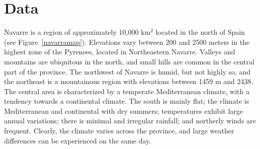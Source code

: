 \section{Data}
\label{Chap6_sec:Data}
Navarre is a region of approximately 10,000 km$^2$ located in the north of Spain (see Figure~\ref{navarramap}). Elevations vary between 200 and 2500 meters in the highest zone of the
Pyrenees, located in Northeastern Navarre. Valleys and mountains are ubiquitous in the north, and small hills are common
in the central part of the province.
The northwest of Navarre is humid, but not highly so, and the northeast is a mountainous region with elevations between 1459 m and 2438.
The central area is characterized by a temperate Mediterranean climate, with a tendency towards a continental climate.
The south is mainly flat; the climate is Mediterranean and continental with dry summers; temperatures exhibit large annual variations;
there is minimal and irregular rainfall;
and northerly winds are frequent. Clearly, the climate varies across the province, and large weather differences can be experienced on the same day.


